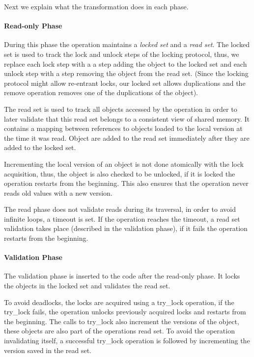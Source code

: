 Next we explain what the transformation does in each phase. 

\paragraph{Read-only Phase} 
  During this phase the operation maintains a \emph{locked set}
  and a \emph{read set}. 
  The locked set is used to track the lock and unlock steps
  of the locking protocol, thus, we replace each lock step 
  with a a step adding the object to the locked set and each
  unlock step with a step removing the object from the read
  set. (Since the locking protocol might allow re-entrant locks, 
  our locked set allows duplications and the remove operation
  removes one of the duplications of the object).  
  
The read set is used to track all objects accessed by the 
operation in order to later validate that this read set
belongs to a consistent view of shared memory.  
It contains a mapping between references to objects loaded 
to the local version at the time it was read. Object are 
added to the read set immediately after they are added to 
the locked set.  

Incrementing the local version of an object is not 
done atomically with the lock acquisition, thus, 
the object is also checked to be unlocked, if it is locked
the operation restarts from the beginning. 
This also ensures that the operation never reads old values 
with a new version. 
 
The read phase does not validate reads during its traversal, 
in order to avoid infinite loops, a timeout is set. 
If the operation reaches the timeout, a read set 
validation takes place (described in the validation phase), 
if it fails the operation restarts from the beginning.
  

\paragraph{Validation Phase} 
The validation phase is inserted to the code after
the read-only phase. It locks the objects in the locked set
and validates the read set. 

To avoid deadlocks, the locks are acquired using a try\_lock
operation, if the try\_lock fails, the operation unlocks 
previously acquired locks and restarts from the beginning. 
The calls to try\_lock also increment the versions 
of the object,  these objects are also part of the 
operations read set. 
To avoid the operation invalidating itself, 
a successful try\_lock operation is followed by incrementing
the version saved in the read set.  

